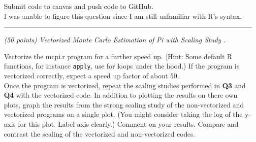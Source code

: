 \documentclass{article}
\newcommand{\myhrule}{ \begin{center}\rule{.9\linewidth}{.25mm}\end{center} }
\newcommand{\pad}{\vspace{8pt}\noindent}
\begin{document}
\noindent Submit code to canvas and push code to GitHub. \\

I was unable to figure this question since I am still unfamiliar with R's syntax.

\myhrule

\pad {\bf Extra Credit:} {\it (50 points) Vectorized Monte Carlo Estimation of Pi with Scaling Study .}
\vspace{8pt} 

\noindent Vectorize the mcpi.r program for a further speed up. (Hint: Some default R functions, for instance \texttt{apply}, use for loops under the hood.) If the program is vectorized correctly, expect a speed up factor of about 50. \\


\noindent Once the program is vectorized, repeat the scaling studies performed in \textbf{Q3} and \textbf{Q4} with the vectorized code. In addition to plotting the results on there own plots, graph the results from the strong scaling study of the non-vectorized and vectorized programs on a single plot. (You might consider taking the log of the y-axis for this plot. Label axis clearly.) Comment on your results. Compare and contrast the scaling of the vectorized and non-vectorized codes.





\end{document}
